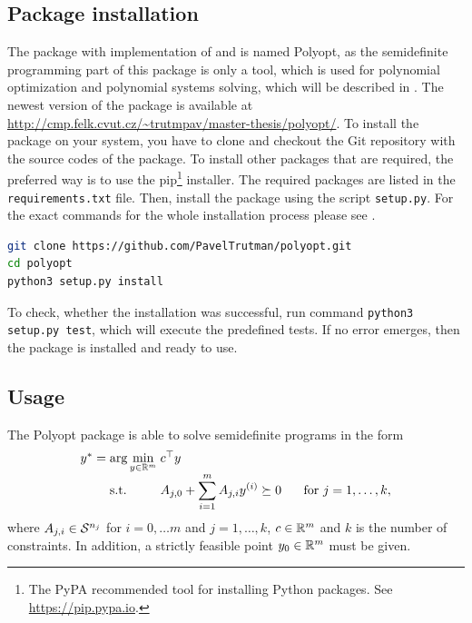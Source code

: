 \subsection{Package installation}
The package with implementation of  and  is named Polyopt, as the semidefinite programming part of this package is only a tool, which is  used for polynomial optimization and polynomial systems solving, which will be described in .
The newest version of the package is available at \url{http://cmp.felk.cvut.cz/~trutmpav/master-thesis/polyopt/}.
To install the package on your system, you have to clone and checkout the Git repository with the source codes of the package.
To install other packages that are required, the preferred way is to use the pip\footnote{The PyPA recommended tool for installing Python packages. See \url{https://pip.pypa.io}.} installer. The required packages are listed in the \texttt{requirements.txt} file.
Then, install the package using the script \texttt{setup.py}.
For the exact commands for the whole installation process please see .
\begin{lstlisting}[language=bash, caption={Installation of the package Polyopt.}, labellis={SDP:imp:install}]
git clone https://github.com/PavelTrutman/polyopt.git
cd polyopt
python3 setup.py install
\end{lstlisting}
To check, whether the installation was successful, run command \texttt{python3 setup.py test}, which will execute the predefined tests.
If no error emerges, then the package is installed and ready to use.

\subsection{Usage}
The Polyopt package is able to solve semidefinite programs in the form
\begin{align}
  \arraycolsep=1.4pt
  \begin{array}{rclrcl@{\hskip0.5cm}l}
    y^* &=& \displaystyle \arg\min_{y\in\R^m} & \multicolumn{3}{l}{c^\top y} \\
    && \text{s.t.} & \displaystyle A_{j,0} + \sum_{i=1}^m A_{j,i}y\ind i &\succeq& 0 & \text{ for } j = 1,\ldots,k,
  \end{array}\labeleq{SDP:imp:problem}
\end{align}
where $A_{j,i}\in\mathcal{S}^{n_j}$ for $i = 0,\dots m$ and $j=1,\dots,k$, $c\in\mathbb{R}^m$ and $k$ is the number of constraints.
In addition, a strictly feasible point $y_0\in\mathbb{R}^m$ must be given.

